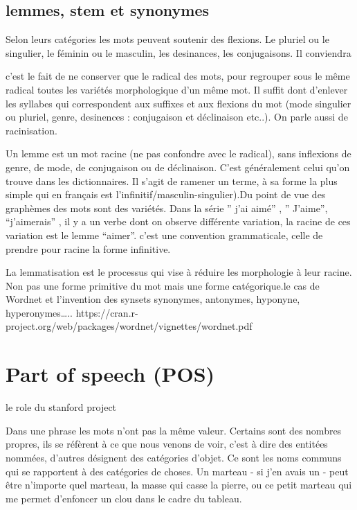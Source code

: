 \documentclass[
  letterpaper,
  DIV=11,
  numbers=noendperiod]{scrreprt}
\begin{document}
\subsection{lemmes, stem et synonymes}\label{lemmes-stem-et-synonymes}

Selon leurs catégories les mots peuvent soutenir des flexions. Le
pluriel ou le singulier, le féminin ou le masculin, les desinances, les
conjugaisons. Il conviendra

c'est le fait de ne conserver que le radical des mots, pour regrouper
sous le même radical toutes les variétés morphologique d'un même mot. Il
suffit dont d'enlever les syllabes qui correspondent aux suffixes et aux
flexions du mot (mode singulier ou pluriel, genre, desinences :
conjugaison et déclinaison etc..). On parle aussi de racinisation.

Un lemme est un mot racine (ne pas confondre avec le radical), sans
inflexions de genre, de mode, de conjugaison ou de déclinaison. C'est
généralement celui qu'on trouve dans les dictionnaires. Il s'agit de
ramener un terme, à sa forme la plus simple qui en français est
l'infinitif/masculin-singulier).Du point de vue des graphèmes des mots
sont des variétés. Dans la série '' j'ai aimé'' , '' J'aime'',
``j'aimerais'' , il y a un verbe dont on observe différente variation,
la racine de ces variation est le lemme ``aimer''. c'est une convention
grammaticale, celle de prendre pour racine la forme infinitive.

La lemmatisation est le processus qui vise à réduire les morphologie à
leur racine. Non pas une forme primitive du mot mais une forme
catégorique.le cas de Wordnet et l'invention des synsets synonymes,
antonymes, hyponyne, hyperonymes\ldots..
https://cran.r-project.org/web/packages/wordnet/vignettes/wordnet.pdf

\section{Part of speech (POS)}\label{part-of-speech-pos}

le role du stanford project

Dans une phrase les mots n'ont pas la même valeur. Certains sont des
nombres propres, ils se réfèrent à ce que nous venons de voir, c'est à
dire des entitées nommées, d'autres désignent des catégories d'objet. Ce
sont les noms communs qui se rapportent à des catégories de choses. Un
marteau - si j'en avais un - peut être n'importe quel marteau, la masse
qui casse la pierre, ou ce petit marteau qui me permet d'enfoncer un
clou dans le cadre du tableau.
\end{document}
